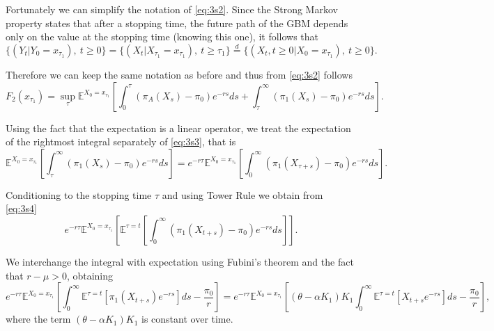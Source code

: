 Fortunately we can simplify the notation of \eqref{eq:3s2}. Since the Strong Markov property states that after a stopping time, the future path of the GBM depends only on the value at the stopping time (knowing this one), it follows that 
$$\{(Y_t | Y_0=x_{\tau_1}), \ t\geq0 \} = \{(X_t | X_{\tau_1}=x_{\tau_1}),\ t\geq \tau_1 \} \overset{d}{=}  \{(X_{t},t\geq0 | X_0=x_{\tau_1}), \ t\geq0 \}. $$

Therefore we can keep the same notation as before and thus from \eqref{eq:3s2} follows
\begin{equation}
F_2(x_{\tau_1})=\sup_{\tau} \mathds{E}^{X_0=x_{\tau_1}} \left[ \int_0^{\tau} \left( \pi_A(X_s)-\pi_0 \right) e^{-rs}ds + \int_{\tau}^\infty \left( \pi_1(X_s)-\pi_0 \right) e^{-rs}ds  \right].
\label{eq:3s3}
\end{equation}


Using the fact that the expectation is a linear operator, we treat the expectation of the rightmost integral separately of \eqref{eq:3s3}, that is
\begin{equation}
\mathds{E}^{X_0=x_{\tau_1}} \left[  \int_{\tau}^\infty \left( \pi_1(X_s)-\pi_0 \right) e^{-rs}ds  \right] =  e^{-r\tau} \mathds{E}^{X_0=x_{\tau_1}} \left[  \int_{0}^\infty \left( \pi_1(X_{\tau+s})-\pi_0 \right) e^{-rs}ds  \right].
\label{eq:3s4}
\end{equation}

Conditioning to the stopping time $\tau$ and using Tower Rule we obtain from \eqref{eq:3s4}
\begin{equation}
e^{-r\tau} \mathds{E}^{X_0=x_{\tau_1}} \left[ \mathds{E}^{\tau=t}  \left[ \int_{0}^\infty \left( \pi_1(X_{t+s})-\pi_0 \right) e^{-rs}ds  \right] \right].
\label{eq:3s5}
\end{equation}

We interchange the integral with expectation using Fubini's theorem and the fact that $r-\mu>0$, obtaining
\begin{equation}
e^{-r\tau} \mathds{E}^{X_0=x_{\tau_1}} \left[  \int_{0}^\infty \mathds{E}^{\tau=t}  \left[ \pi_1(X_{t+s}) e^{-rs}  \right] ds - \frac{\pi_0}{r} \right]=  e^{-r\tau} \mathds{E}^{X_0=x_{\tau_1}} \left[    (\theta-\alpha K_1)K_1  \int_{0}^\infty \mathds{E}^{\tau=t}  \left[  X_{t+s} e^{-rs}  \right] ds - \frac{\pi_0}{r} \right],
\label{eq:3s6}
\end{equation}
where the term $ (\theta-\alpha K_1)K_1$ is constant over time.


